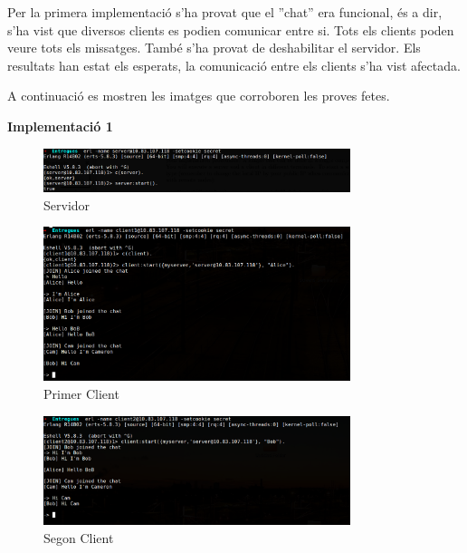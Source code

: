 \documentclass[a4paper, 11pt]{article}
\begin{document}
Per la primera implementació s'ha provat que el ''chat'' era funcional, és a
dir, s'ha vist que diversos clients es podien comunicar entre si. Tots els
clients poden veure tots els missatges.  També s'ha provat de deshabilitar el
servidor. Els resultats han estat els esperats, la comunicació entre els clients
s'ha vist afectada.

A continuació es mostren les imatges que corroboren les proves fetes.

\begin{center} 
    \textbf{Implementació 1}
\end{center}

\begin{figure}[H]
    \centering   
    \includegraphics[width=0.8\textwidth]{figures/Server1_start}
    \caption{Servidor \label{fig:Impl1_Server}}
\end{figure}

\begin{figure}[H]
    \centering
	\includegraphics[width=0.8\textwidth]{figures/Server1_Al}
    \caption{Primer Client \label{fig:Impl1_Al}}
\end{figure}

\begin{figure}[H]
    \centering   
	\includegraphics[width=0.8\textwidth]{figures/Server1_Bob}
    \caption{Segon Client \label{fig:Impl1_Bob}}    
\end{figure}    
    
\end{document}
